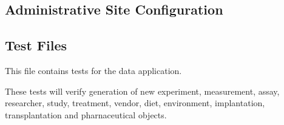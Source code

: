 \documentclass[letterpaper,10pt,english]{sphinxmanual}
\begin{document}
\begin{fulllineitems}
\label{api:data.views.study_experiment}
\end{fulllineitems}

\label{api:module-data.urls}

\subsection{Administrative Site Configuration}
\label{api:administrative-site-configuration}\label{api:module-data.admin}

\subsection{Test Files}
\label{api:test-files}\label{api:module-data.tests}
This file contains tests for the data application.

These tests will verify generation of new experiment, measurement, assay, researcher, study, treatment, vendor, diet, environment, implantation, transplantation and pharnaceutical objects.

\end{document}
